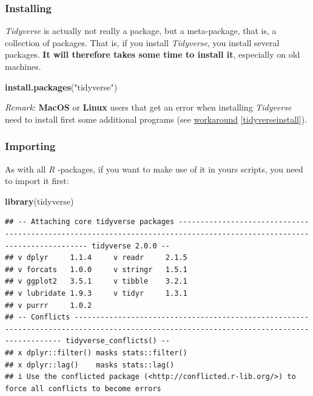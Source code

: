 \documentclass[
]{scrartcl}
\newenvironment{Shaded}{\begin{snugshade}}{\end{snugshade}}
\newcommand{\FunctionTok}[1]{\textcolor[rgb]{0.13,0.29,0.53}{\textbf{#1}}}
\newcommand{\NormalTok}[1]{#1}
\newcommand{\StringTok}[1]{\textcolor[rgb]{0.31,0.60,0.02}{#1}}
\begin{document}
\subsubsection*{Installing}\label{installing}

\emph{Tidyverse} is actually not really a package, but a meta-package, that is, a collection of packages. That is, if you install \emph{Tidyverse}, you install several packages. \textbf{It will therefore takes some time to install it}, especially on old machines.

\begin{Shaded}
\begin{Highlighting}[]
\FunctionTok{install.packages}\NormalTok{(}\StringTok{"tidyverse"}\NormalTok{)}
\end{Highlighting}
\end{Shaded}

\emph{Remark}: \textbf{MacOS} or \textbf{Linux} users that get an error when installing \emph{Tidyverse} need to install first some additional programs (see \hyperref[tidyverseinstall]{workaround} \ref{tidyverseinstall}).

\subsubsection*{Importing}\label{importing}

As with all \emph{R} -packages, if you want to make use of it in yours scripts, you need to import it first:

\begin{Shaded}
\begin{Highlighting}[]
\FunctionTok{library}\NormalTok{(tidyverse)}
\end{Highlighting}
\end{Shaded}

\begin{verbatim}
## -- Attaching core tidyverse packages ----------------------------------------------------------------------------------------------------------------------- tidyverse 2.0.0 --
## v dplyr     1.1.4     v readr     2.1.5
## v forcats   1.0.0     v stringr   1.5.1
## v ggplot2   3.5.1     v tibble    3.2.1
## v lubridate 1.9.3     v tidyr     1.3.1
## v purrr     1.0.2     
## -- Conflicts ----------------------------------------------------------------------------------------------------------------------------------------- tidyverse_conflicts() --
## x dplyr::filter() masks stats::filter()
## x dplyr::lag()    masks stats::lag()
## i Use the conflicted package (<http://conflicted.r-lib.org/>) to force all conflicts to become errors
\end{verbatim}
\end{document}
